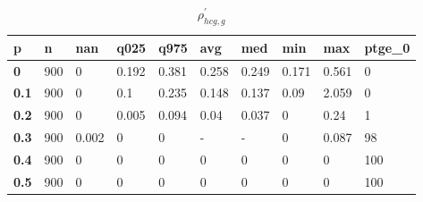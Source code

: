 \begin{table}[h]
 \centering 
\footnotesize
\caption{$\rho_{hcg,g}^\prime $}
\label{tab:alphahcgg}
\begin{tabular}[h]{|l|l|l|l|l|l|l|l|l|l|
    } \hline
\textbf{ p} & \textbf{ n} & \textbf{ nan} & \textbf{ q025} & \textbf{ q975} & \textbf{ avg} & \textbf{ med} & \textbf{ min} & \textbf{ max} & \textbf{ ptge\_0}
    \\ \hline
  \textbf{  0} & 900 &     0 & 0.192 & 0.381 & 0.258 & 0.249 & 0.171 & 0.561 &   0
    \\ \hline
  \textbf{0.1} & 900 &     0 &   0.1 & 0.235 & 0.148 & 0.137 &  0.09 & 2.059 &   0
    \\ \hline
  \textbf{0.2} & 900 &     0 & 0.005 & 0.094 &  0.04 & 0.037 &     0 &  0.24 &   1
    \\ \hline
  \textbf{0.3} & 900 & 0.002 &     0 &     0 & - & - &     0 & 0.087 &  98
    \\ \hline
  \textbf{0.4} & 900 &     0 &     0 &     0 &     0 &     0 &     0 &     0 & 100
    \\ \hline
  \textbf{0.5} & 900 &     0 &     0 &     0 &     0 &     0 &     0 &     0 & 100
    \\ \hline
 \end{tabular}
 \end{table}
